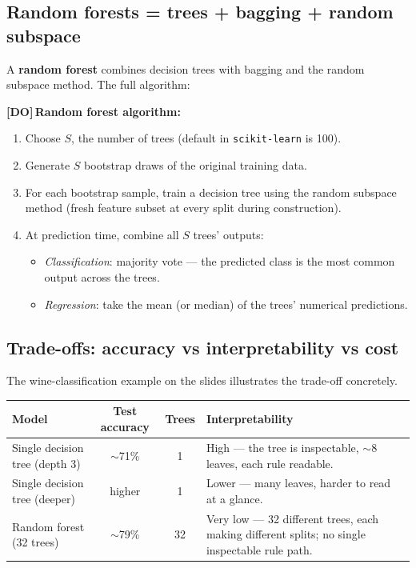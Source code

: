 \documentclass[11pt, a4paper]{article}
\newcommand{\thead}[1]{\textbf{#1}}
\newcommand{\doflag}{\textcolor{defBd}{\textbf{[DO]}}\,}
\begin{document}
\subsection{Random forests = trees + bagging + random subspace}

\begin{defbox}
A \textbf{random forest} combines decision trees with bagging and the random subspace method. The full algorithm:
\end{defbox}

\doflag{}\textbf{Random forest algorithm:}
\begin{enumerate}
  \item Choose $S$, the number of trees (default in \texttt{scikit-learn} is 100).
  \item Generate $S$ bootstrap draws of the original training data.
  \item For each bootstrap sample, train a decision tree using the random subspace method (fresh feature subset at every split during construction).
  \item At prediction time, combine all $S$ trees' outputs:
        \begin{itemize}
          \item \emph{Classification}: majority vote — the predicted class is the most common output across the trees.
          \item \emph{Regression}: take the mean (or median) of the trees' numerical predictions.
        \end{itemize}
\end{enumerate}

\subsection{Trade-offs: accuracy vs interpretability vs cost}

The wine-classification example on the slides illustrates the trade-off concretely.

\begin{center}
\renewcommand{\arraystretch}{1.2}
\begin{tabularx}{\linewidth}{l c c X}
\toprule
\thead{Model} & \thead{Test accuracy} & \thead{Trees} & \thead{Interpretability} \\
\midrule
Single decision tree (depth 3) & $\sim$71\% & 1 & High — the tree is inspectable, $\sim$8 leaves, each rule readable. \\
Single decision tree (deeper) & higher & 1 & Lower — many leaves, harder to read at a glance. \\
Random forest (32 trees) & $\sim$79\% & 32 & Very low — 32 different trees, each making different splits; no single inspectable rule path. \\
\bottomrule
\end{tabularx}
\end{center}
\end{document}
